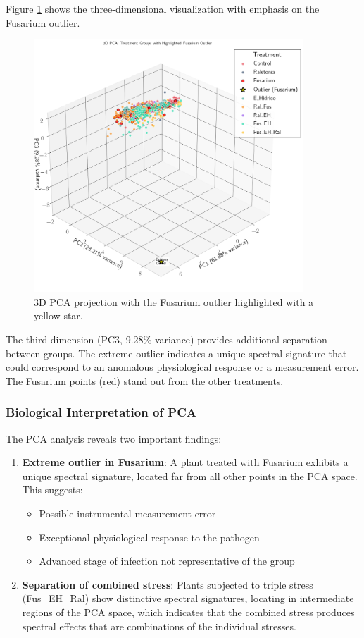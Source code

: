 \documentclass[12pt,a4paper]{article}
\begin{document}
Figure \ref{fig:pca3d} shows the three-dimensional visualization with emphasis on the Fusarium outlier.

\begin{figure}[H]
    \centering
    \includegraphics[width=0.9\textwidth]{Plots/3D_PCA.png}
    \caption{3D PCA projection with the Fusarium outlier highlighted with a yellow star. }
    \label{fig:pca3d}
\end{figure}

The third dimension (PC3, 9.28\% variance) provides additional separation between groups. The extreme outlier indicates a unique spectral signature that could correspond to an anomalous physiological response or a measurement error. The Fusarium points (red) stand out from the other treatments.

\subsubsection{Biological Interpretation of PCA}

The PCA analysis reveals two important findings:

\begin{enumerate}
    \item \textbf{Extreme outlier in Fusarium}: A plant treated with Fusarium exhibits a unique spectral signature, located far from all other points in the PCA space. This suggests:
    \begin{itemize}
        \item Possible instrumental measurement error
        \item Exceptional physiological response to the pathogen
        \item Advanced stage of infection not representative of the group
    \end{itemize}
    
    \item \textbf{Separation of combined stress}: Plants subjected to triple stress (Fus\_EH\_Ral) show distinctive spectral signatures, locating in intermediate regions of the PCA space, which indicates that the combined stress produces spectral effects that are combinations of the individual stresses.
\end{enumerate}
\end{document}
